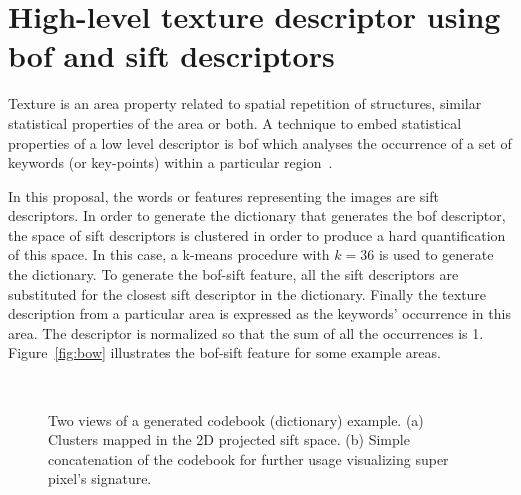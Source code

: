 \documentclass[a4paper, 10pt, conference]{llncs}      %
\begin{document}



\section{High-level texture descriptor using \acf{bof} and \ac{sift} descriptors}%
Texture is an area property related to spatial repetition of structures, similar statistical properties of the area or both. A technique to embed statistical properties of a low level descriptor is \ac{bof} which analyses the occurrence of a set of keywords (or key-points) within a particular region~\cite{csurka2004visual}. 

In this proposal, the words or features representing the images are \ac{sift} descriptors. In order to generate the dictionary that generates the \ac{bof} descriptor, the space of \ac{sift} descriptors is clustered in order to produce a hard quantification of this space. In this case, a k-means procedure with $k=36$ is used to generate the dictionary. To generate the \ac{bof}-\ac{sift} feature, all the \ac{sift} descriptors are substituted for the closest \ac{sift} descriptor in the dictionary. Finally the texture description from a particular area is expressed as the keywords' occurrence in this area. The descriptor is normalized so that the sum of all the occurrences is 1. 
Figure~\ref{fig:bow} illustrates the \ac{bof}-\ac{sift} feature for some example areas. %

\begin{figure}[Htbp]
\centering
{}~
\caption{Two views of a generated codebook (dictionary) example. (a) Clusters mapped in the 2D projected \ac{sift} space. (b) Simple concatenation of the codebook for further usage visualizing super pixel's signature.}
\label{fig:dictionaryConstruction}
\end{figure}
\end{document}
